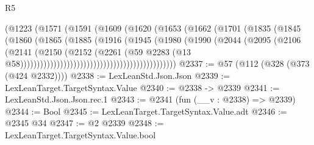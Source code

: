 \begin{lexlean}{R5}
\begin{coremodule}
{{{{{{{{{{{{{{{{{{{{{{{{{{{{{{{{{{{{{{{{{{{{{{{{{{{{{{{{{{{{{{{{{{{{{{{{{{{{{{{{{{{{{{{{{{{{                                              (@1223
                                                (@1571
                                                  (@1591
                                                    (@1609
                                                      (@1620
                                                        (@1653
                                                          (@1662
                                                            (@1701
                                                              (@1835
                                                                (@1845
                                                                  (@1860
                                                                    (@1865
                                                                      (@1885
                                                                        (@1916
                                                                          (@1945
                                                                            (@1980
                                                                              (@1990
                                                                                (@2044
                                                                                  (@2095
                                                                                    (@2106
                                                                                      (@2141
                                                                                        (@2150
                                                                                          (@2152
                                                                                            (@2261
                                                                                              (@59
                                                                                                @2283
                                                                                                (@13
                                                                                                  @58)))))))))))))))))))))))))))))))))))))))))))))))
@2337 := @57 (@112 (@328 (@373 (@424 @2332))))
@2338 := LexLeanStd.Json.Json
@2339 := LexLeanTarget.TargetSyntax.Value
@2340 := @2338 -> @2339
@2341 := LexLeanStd.Json.Json.rec.{1}
@2343 := @2341 (fun (__v : @2338) => @2339)
@2344 := Bool
@2345 := LexLeanTarget.TargetSyntax.Value.adt
@2346 := @2345 @34
@2347 := @2 @2339
@2348 := LexLeanTarget.TargetSyntax.Value.bool
}}}}}}}}}}}}}}}}}}}}}}}}}}}}}}}}}}}}}}}}}}}}}}}}}}}}}}}}}}}}}}}}}}}}}}}}}}}}}}}}}}}}}}}}}}}}
\end{coremodule}
\end{lexlean}
